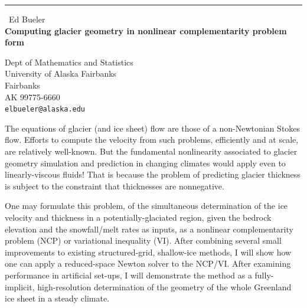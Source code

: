 \documentclass{report}
\begin{document}
\begin{center}
\rule{6in}{1pt} \
{\large Ed Bueler \\
{\bf Computing glacier geometry in nonlinear complementarity problem form}}

Dept of Mathematics and Statistics \\ University of Alaska Fairbanks \\ Fairbanks \\ AK 99775-6660
\\
{\tt elbueler@alaska.edu}\end{center}

The equations of glacier (and ice sheet) flow are those of a
non-Newtonian Stokes flow. Efforts to compute the velocity from such
problems, efficiently and at scale, are relatively well-known. But the
fundamental nonlinearity associated to glacier geometry simulation and
prediction in changing climates would apply even to linearly-viscous
fluids! That is because the problem of predicting glacier thickness is
subject to the constraint that thicknesses are nonnegative.

One may formulate this problem, of the simultaneous determination of the
ice velocity and thickness in a potentially-glaciated region, given the
bedrock elevation and the snowfall/melt rates as inputs, as a nonlinear
complementarity problem (NCP) or variational inequality (VI). After
combining several small improvements to existing structured-grid,
shallow-ice methods, I will show how one can apply a reduced-space Newton
solver to the NCP/VI. After examining performance in artificial set-ups,
I will demonstrate the method as a fully-implicit, high-resolution
determination of the geometry of the whole Greenland ice sheet in a
steady climate.
\end{document}
